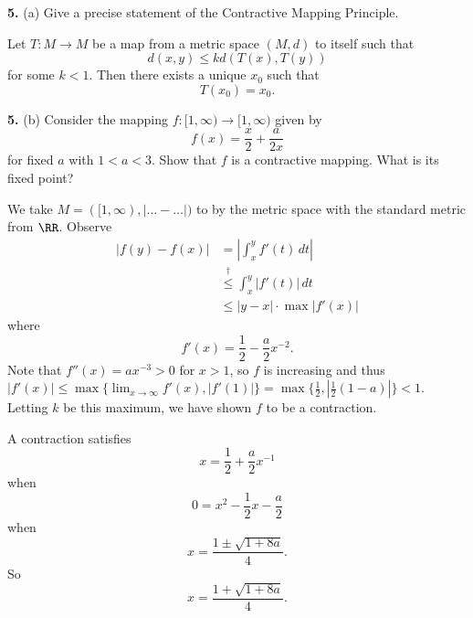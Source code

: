 \documentclass{homework}
\author{Kevin Joyce}
\begin{document}
 
\newcommand{\figref}[1]{\figurename~\ref{#1}}
\renewcommand{\bar}{\overline}
\renewcommand{\hat}{\widehat}
\renewcommand{\SS}{\mathcal S}
\newcommand{\eps}{\varepsilon}
\newcommand{\TTheta}{\overline{\underline \Theta} }
\newcommand{\del}{\partial}
\newcommand{\approxsim}{\overset{\cdotp}{\underset{\cdotp}{\sim}}}
\newcommand{\FF}{\mathcal F}
\renewcommand{\Re}{\mathrm{Re}\,}
\renewcommand{\Im}{\mathrm{Im}\,}
\newcommand{\HH}{\mathcal H}
\nocite{*}

{\bf 5.} (a) Give a precise statement of the Contractive Mapping Principle.

\begin{solution}
  Let $T:M\to M$ be a map from a metric space $(M,d)$ to itself such that 
  $$
    d(x,y) \le k d(T(x),T(y))
  $$
  for some $k<1$.  Then there exists a unique $x_0$ such that
  $$
    T(x_0) = x_0.
  $$
\end{solution}

{\bf 5.} (b) Consider the mapping $f:[1,\infty) \to [1,\infty)$ given by 
$$
  f(x) = \frac x2 + \frac a{2x}
$$
for fixed $a$ with $1<a<3$.  Show that $f$ is a contractive mapping.  What is its fixed point?

\begin{solution}
We take $M = ([1,\infty),| \ldots - \dots|)$ to by the metric space with the standard metric from $\RR$.  Observe
\begin{align*}
  |f(y) - f(x)| 
  &= \left| \int_x^y f'(t) \,dt \right|\\
  &\stackrel{\dagger}\le\int_x^y\left|  f'(t) \right|\,dt \\
  &\le |y-x| \cdot \max |f'(x)|
\end{align*}
where 
$$
  f'(x) = \frac 12 - \frac a2x^{-2}.
$$
Note that $f''(x) = ax^{-3} > 0$ for $x>1$, so $f$ is increasing and thus $|f'(x)| \le \max\{\lim_{x\to\infty} f'(x), |f'(1)|\} = \max\{\frac 12, |\frac 12(1-a)|\}< 1$. Letting $k$ be this maximum, we have shown $f$ to be a contraction.  

A contraction satisfies
$$
  x = \frac 12 + \frac a2 x^{-1}
$$ 
when
$$
  0 = x^2 - \frac 12 x - \frac a2
$$
when 
$$
  x = \frac {1 \pm \sqrt{1 + 8a} }4.
$$
So 
$$
  x = \frac {1 + \sqrt{1 + 8a} }4.
$$

\end{solution}
\end{document}
